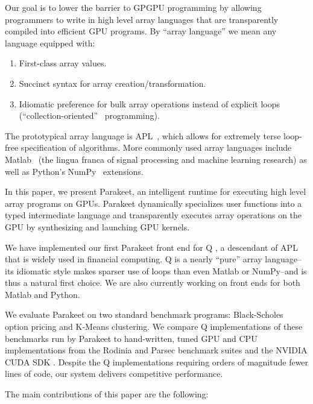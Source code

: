 \documentclass[preprint]{sigplanconf}
\begin{document}
Our goal is to lower the barrier to GPGPU programming by allowing programmers to
write in high level array languages that are transparently compiled into
efficient GPU programs. By ``array language'' we mean any language equipped
with:
\begin{enumerate}
\item First-class array values.
\item Succinct syntax for array creation/transformation.
\item Idiomatic preference for bulk array operations instead of explicit loops
(``collection-oriented''~\cite{Sip91} programming).
\end{enumerate}

The prototypical array language is APL~\cite{Iverson62}, which allows for
extremely terse loop-free specification of algorithms. More commonly used array 
languages include Matlab~\cite{Moler80} (the lingua franca of signal processing
and machine learning research) as well as Python's NumPy~\cite{Oliphant07}
extensions. 


In this paper, we present Parakeet, an intelligent runtime for executing high
level array programs on GPUs. Parakeet dynamically specializes user functions 
into a typed intermediate language and transparently executes array operations
on the GPU by synthesizing and launching GPU kernels.


We have implemented our first Parakeet front end for Q \cite{Borr08}, a
descendant of APL that is widely used in financial computing. 
Q is a nearly ``pure'' array language--its idiomatic style makes sparser use of
loops than even Matlab or NumPy--and is thus a natural first choice.
We are also currently working on front ends for both Matlab and Python.

We evaluate Parakeet on two standard benchmark programs: Black-Scholes option
pricing and K-Means clustering.  We compare Q implementations of these
benchmarks run by Parakeet to hand-written, tuned GPU and CPU implementations
from the Rodinia \cite{Che09} and Parsec \cite{Bien08} benchmark suites and the
NVIDIA CUDA SDK \cite{NvidSD}.  Despite the Q implementations requiring orders
of magnitude fewer lines of code, our system delivers competitive performance.

The main contributions of this paper are the following:
\end{document}
